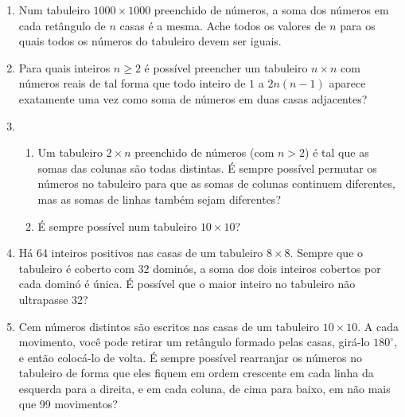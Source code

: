 \documentclass{article}
\begin{document}
\begin{enumerate}
    \item Num tabuleiro $1000\times 1000$ preenchido de números,
    a soma dos números em cada retângulo de $n$ casas é a mesma.
    Ache todos os valores de $n$ para os quais todos os números do tabuleiro devem ser iguais.
    
    \item Para quais inteiros $n\geq 2$ é possível
    preencher um tabuleiro $n\times n$ com números reais
    de tal forma que todo inteiro de $1$ a $2n(n-1)$ aparece exatamente uma vez
    como soma de números em duas casas adjacentes?
    
    \item \begin{enumerate}
    \item Um tabuleiro $2\times n$ preenchido de números (com $n>2$)
    é tal que as somas das colunas são todas distintas.
    É sempre possível permutar os números no tabuleiro
    para que as somas de colunas continuem diferentes,
    mas as somas de linhas também sejam diferentes?
    
    \item É sempre possível num tabuleiro $10\times 10$?
    \end{enumerate}
    
    \item Há 64 inteiros positivos nas casas de um tabuleiro $8\times8$.
    Sempre que o tabuleiro é coberto com 32 dominós,
    a soma dos dois inteiros cobertos por cada dominó é única.
    É possível que o maior inteiro no tabuleiro não ultrapasse 32?
    
    \item Cem números distintos são escritos nas casas de um tabuleiro $10\times10$.
    A cada movimento, você pode retirar um retângulo formado pelas casas,
    girá-lo $180^{\circ}$, e então colocá-lo de volta.
    É sempre possível rearranjar os números no tabuleiro
    de forma que eles fiquem em ordem crescente em cada linha
    da esquerda para a direita,
    e em cada coluna, de cima para baixo,
    em não mais que 99 movimentos?
\end{enumerate}
\end{document}
